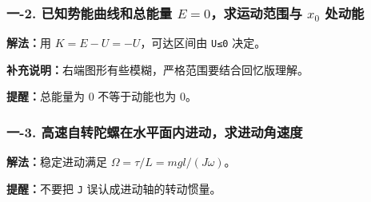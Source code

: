 \documentclass[12pt,a4paper]{ctexart}
\begin{document}
\subsubsection*{一-2. 已知势能曲线和总能量 \(E=0\)，求运动范围与 \(x_0\) 处动能}
\begin{tcolorbox}[colback=gray!2!white,colframe=black!60,title={题目}]

\end{tcolorbox}
\begin{tcolorbox}[colback=blue!2!white,colframe=blue!55!black,title={完整答案}]
\textbf{解法：}用 \(K=E-U=-U\)，可达区间由 \texttt{U≤0} 决定。\par

\textbf{补充说明：}右端图形有些模糊，严格范围要结合回忆版理解。\par
\end{tcolorbox}
\begin{tcolorbox}[colback=red!2!white,colframe=red!55!black,title={易错点}]
\textbf{提醒：}总能量为 0 不等于动能也为 0。\par
\end{tcolorbox}

\subsubsection*{一-3. 高速自转陀螺在水平面内进动，求进动角速度}
\begin{tcolorbox}[colback=gray!2!white,colframe=black!60,title={题目}]

\end{tcolorbox}
\begin{tcolorbox}[colback=blue!2!white,colframe=blue!55!black,title={完整答案}]
\textbf{解法：}稳定进动满足 \(Ω=τ/L=mgl/(Jω)\)。\par


\end{tcolorbox}
\begin{tcolorbox}[colback=red!2!white,colframe=red!55!black,title={易错点}]
\textbf{提醒：}不要把 \texttt{J} 误认成进动轴的转动惯量。\par
\end{tcolorbox}
\end{document}
